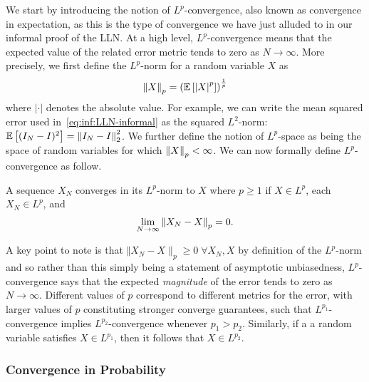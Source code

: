 We start by introducing the notion of $L^p$-convergence, also known as convergence in expectation,
as this is the type of convergence we have just alluded to in our informal proof of the LLN.
At a high level, $L^p$-convergence means that the expected value of the related error metric
tends to zero as $N\rightarrow \infty$.  More precisely, we first define the $L^p$-norm for
a random variable $X$ as
\begin{align}
\label{eq:inf:Lp-norm}
\left\lVert X\right\rVert_p = \left(\mathbb{E} \left[\left|X\right|^{p}\right]\right)^{\frac{1}{p}}
\end{align}
where $\left|\cdot\right|$ denotes the absolute value.  For example, we can write the
mean squared error used in~\eqref{eq:inf:LLN-informal} as the squared $L^2$-norm:
$\mathbb{E} \left[(I_N-I)^2\right] = \left\lVert I_N-I\right\rVert_2^2$.  We further define the notion of $L^p$-space
as being the space of random variables for which $\left\lVert X\right\rVert_p < \infty$.  We can now
formally define $L^p$-convergence as follow.
\begin{definition}[$L^p$-convergence]
A sequence $X_N$ converges in its $L^p$-norm to $X$ where $p\ge1$ if $X\in L^p$, each $X_N \in L^p$, and
\begin{align}
\lim\limits_{N\rightarrow\infty} \left\lVert X_N-X\right\rVert_p=0. \label{eq:inf:Lp-conv-formal}
\end{align}
\end{definition}
A key point to note is that $\Vert X_N-X\rVert_p\ge0 \; \forall X_N, X$ by definition of the $L^p$-norm and so
rather than this simply being a statement of asymptotic unbiasedness, $L^p$-convergence says that the expected
\emph{magnitude} of the error tends to zero as $N\rightarrow\infty$.
Different values of $p$ correspond to different metrics for the error, with larger values of
$p$ constituting stronger converge guarantees, such that $L^{p_1}$-convergence implies
$L^{p_2}$-convergence whenever $p_1>p_2$.  Similarly, if a a random variable satisfies
$X \in L^{p_1}$, then it follows that $X \in L^{p_2}$.

%
%

\subsubsection{Convergence in Probability}
\label{sec:inf:mc:conv:prob}


